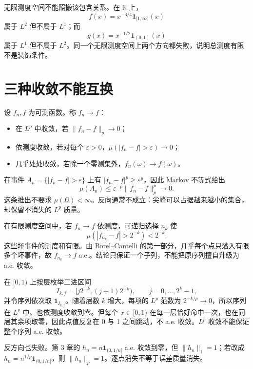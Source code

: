 无限测度空间不能照搬该包含关系。在 $\mathbb R$ 上，
\[
 f(x)=x^{-3/4}\mathbf1_{[1,\infty)}(x)
\]
属于 $L^2$ 但不属于 $L^1$；而
\[
 g(x)=x^{-1/2}\mathbf1_{(0,1)}(x)
\]
属于 $L^1$ 但不属于 $L^2$。同一个无限测度空间上两个方向都失败，说明总测度有限不是装饰条件。

\section{三种收敛不能互换}

设 $f_n,f$ 为可测函数。称 $f_n\to f$：
\begin{itemize}[nosep]
  \item 在 $L^p$ 中收敛，若 $\lVert f_n-f\rVert_p\to0$；
  \item 依测度收敛，若对每个 $\varepsilon>0$，$\mu(|f_n-f|>\varepsilon)\to0$；
  \item 几乎处处收敛，若除一个零测集外，$f_n(\omega)\to f(\omega)$。
\end{itemize}




在事件 $A_n=\{|f_n-f|>\varepsilon\}$ 上有 $|f_n-f|^p\geq\varepsilon^p$，因此 Markov 不等式给出
\[
 \mu(A_n)\leq\varepsilon^{-p}\lVert f_n-f\rVert_p^p\longrightarrow0.
\]
这条推出不要求 $\mu(\Omega)<\infty$。反向通常不成立：尖峰可以占据越来越小的集合，却保留不消失的 $L^p$ 质量。


在有限测度空间中，若 $f_n\to f$ 依测度，可递归选择 $n_k$ 使
\[
 \mu(|f_{n_k}-f|>2^{-k})<2^{-k}.
\]
这些坏事件的测度和有限。由 Borel--Cantelli 的第一部分，几乎每个点只落入有限多个坏事件，故 $f_{n_k}\to f$ a.e.。结论只保证一个子列，不能把原序列擅自升级为 a.e. 收敛。


在 $[0,1)$ 上按层枚举二进区间
\[
 I_{k,j}=[j2^{-k},(j+1)2^{-k}),
 \qquad j=0,\ldots,2^k-1,
\]
并令序列依次取 $\mathbf1_{I_{k,j}}$。随着层数 $k$ 增大，每项的 $L^p$ 范数为 $2^{-k/p}\to0$，所以序列在 $L^p$ 中、也依测度收敛到零。但每个 $x\in[0,1)$ 在每一层恰好命中一次，也在同层其余项取零，因此点值反复在 0 与 1 之间跳动，不 a.e. 收敛。$L^p$ 收敛不能保证整个序列 a.e. 收敛。

反方向也失败。第 3 章的 $h_n=n\mathbf1_{(0,1/n]}$ a.e. 收敛到零，但 $\lVert h_n\rVert_1=1$；若改成 $h_n=n^{1/p}\mathbf1_{(0,1/n]}$，则 $\lVert h_n\rVert_p=1$。逐点消失不等于误差质量消失。


